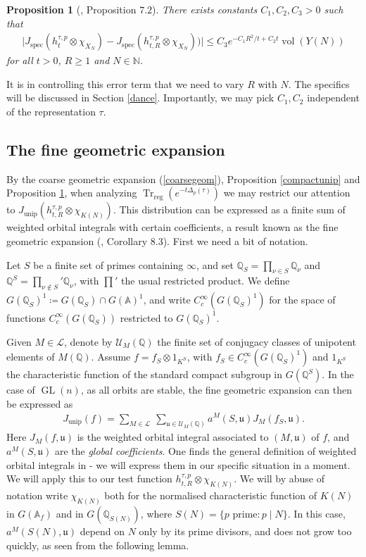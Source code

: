 \documentclass[11pt,reqno]{amsart}
\numberwithin{equation}{section}
\newtheorem{prop}[thm]{Proposition}
\theoremstyle{definition}
\theoremstyle{remark}
\newcommand{\N}{\mathbb{N}}
\newcommand{\Q}{\mathbb{Q}}
\newcommand{\GL}{\operatorname{GL}}
\newcommand{\Trreg}{\operatorname{Tr}_{\operatorname{reg}}}
\newcommand{\vol}{\operatorname{vol}}
\newcommand{\unip}{\operatorname{unip}}
\newcommand{\spec}{\operatorname{spec}}
\newcommand{\mf}[1]{\mathfrak{#1}}
\newcommand{\A}{\mathbb{A}}
\begin{document}
\begin{prop}[\cite{MzM2}, Proposition $7.2$]\label{compactdiff}
    There exists constants $C_1,C_2,C_3>0$ such that
    \begin{align*}
        \big\vert J_{\spec}(h_t^{\tau,p}\otimes\chi_{{X_N}})-J_{\spec}(h_{t,R}^{\tau,p}\otimes\chi_{{X_N}}))\big\vert\leq C_3 e^{-C_1 R^2/t+C_2t}\vol(Y(N))
    \end{align*}
    for all $t>0$, $R\geq 1$ and $N\in\N$.
\end{prop}

\noindent It is in controlling this error term that we need to vary $R$ with $N$. The specifics will be discussed in Section \ref{dance}. Importantly, we may pick $C_1,C_2$ independent of the representation $\tau$. 




\subsection*{The fine geometric expansion}\label{finegeomexppaper}

By the coarse geometric expansion (\ref{coarsegeom}), Proposition \ref{compactunip} and Proposition \ref{compactdiff}, when analyzing $\Trreg(e^{-t\Delta_p(\tau)})$ we may restrict our attention to $J_{\unip}(h^{\tau,p}_{t,R}\otimes\chi_{K(N)})$. This distribution can be expressed as a finite sum of weighted orbital integrals with certain coefficients, a result known as the fine geometric expansion (\cite{Arthur4}, Corollary $8.3$). First we need a bit of notation.

Let $S$ be a finite set of primes containing $\infty$, and set $\Q_S=\prod_{\nu\in S}\Q_\nu$ and $\Q^S=\prod_{\nu\notin S}'\Q_\nu$, with $\prod'$ the usual restricted product. We define $G(\Q_S)^1 \coloneqq G(\Q_S)\cap G(\A)^1$, and write $C_c^\infty(G(\Q_S)^1)$ for the space of functions $C_c^\infty(G(\Q_S))$ restricted to $G(\Q_S)^1$.

Given $M\in \mathcal{L}$, denote by $\mathcal{U}_M(\Q)$ the finite set of conjugacy classes of unipotent elements of $M(\Q)$. Assume $f=f_S\otimes 1_{K^S}$, with $f_S\in C_c^\infty(G(\Q_S)^1)$ and $1_{K^S}$ the characteristic function of the standard compact subgroup in $G(\Q^S)$.
In the case of $\GL(n)$, as all orbits are stable, the fine geometric expansion can then be expressed as 
\begin{align}\label{finegeom}
    J_{\text{unip}}(f) = \sum_{M\in\mathcal{L}}\:\sum_{\mf{u}\in \mathcal{U}_M(\Q)}a^M(S,\mf{u})J_M(f_S,\mf{u}).
\end{align}
Here $J_M(f,\mf{u})$ is the weighted orbital integral associated to $(M,\mf{u})$ of $f$, and $a^M(S,\mf{u})$ are the \emph{global coefficients}. One finds the general definition of weighted orbital integrals in \cite{Arthur1} - we will express them in our specific situation in a moment. We will apply this to our test function $h^{\tau,p}_{t,R}\otimes \chi_{K(N)}$. We will by abuse of notation write $\chi_{K(N)}$ both for the normalised characteristic function of $K(N)$ in $G(\A_f)$ and in $G(\Q_{S(N)})$, where $S(N)=\lbrace p\text{ prime} : p\mid N\rbrace$. In this case, $a^M(S(N),\mf{u})$ depend on $N$ only by its prime divisors, and does not grow too quickly, as seen from the following lemma.
\end{document}
